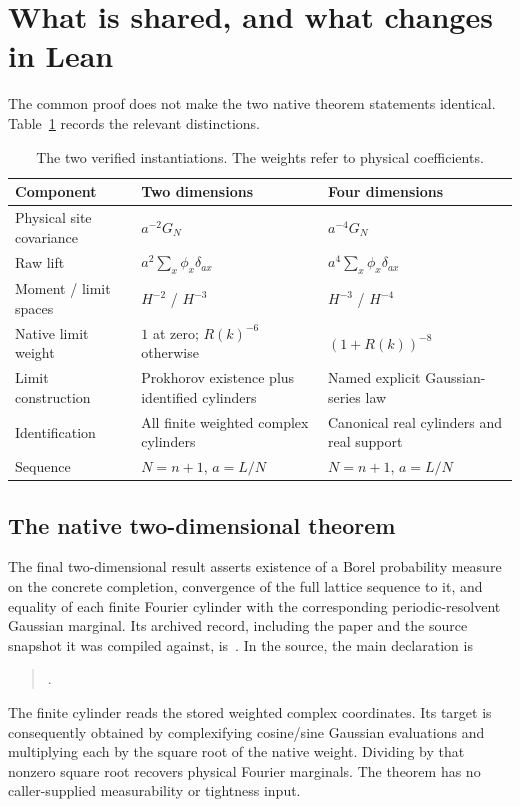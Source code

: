\section{What is shared, and what changes in Lean}\label{sec:comparison}
The common proof does not make the two native theorem statements identical.
Table~\ref{tab:comparison} records the relevant distinctions.
\begin{table}[ht]
\caption{The two verified instantiations. The weights refer to physical coefficients.}\label{tab:comparison}
\centering
\begin{tabular}{@{}p{}p{}p{}@{}}
\toprule
Component & Two dimensions & Four dimensions\\
\midrule
Physical site covariance & $a^{-2}G_N$ & $a^{-4}G_N$\\
Raw lift & $a^2\sum_x\phi_x\delta_{ax}$ & $a^4\sum_x\phi_x\delta_{ax}$\\
Moment / limit spaces & $H^{-2}$ / $H^{-3}$ & $H^{-3}$ / $H^{-4}$\\
Native limit weight & $1$ at zero; $R(k)^{-6}$ otherwise & $(1+R(k))^{-8}$\\
Limit construction & Prokhorov existence plus identified cylinders & Named explicit Gaussian-series law\\
Identification & All finite weighted complex cylinders & Canonical real cylinders and real support\\
Sequence & $N=n+1$, $a=L/N$ & $N=n+1$, $a=L/N$\\
\bottomrule
\end{tabular}
\end{table}

\subsection{The native two-dimensional theorem}
The final two-dimensional result asserts existence of a Borel probability
measure on the concrete completion, convergence of the full lattice sequence
to it, and equality of each finite Fourier cylinder with the corresponding
periodic-resolvent Gaussian marginal. Its archived record, including the paper
and the source snapshot it was compiled against, is~\cite{aiXiv2D}. In the source, the main declaration is
\begin{quote}\raggedright
{}.
\end{quote}
The finite cylinder reads the stored weighted complex coordinates. Its target
is consequently obtained by complexifying cosine/sine Gaussian evaluations
and multiplying each by the square root of the native weight. Dividing by
that nonzero square root recovers physical Fourier marginals. The theorem
has no caller-supplied measurability or tightness input.

